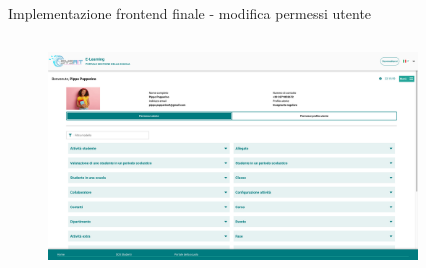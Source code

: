 \documentclass[aspectratio=169]{beamer}
\begin{document}
\begin{frame}[fragile]{Implementazione frontend finale - modifica permessi utente}
	\begin{columns}[T] %
		\begin{column}{0.7\textwidth}
			\begin{figure}
				\centering
				\includegraphics[width=\textwidth]{../images/permission-management-desktop.png}
			\end{figure}
		\end{column}
		\begin{column}{0.2\textwidth}
			\begin{figure}
				\centering

\end{figure}
\end{column}
\end{columns}
\end{frame}
\end{document}
